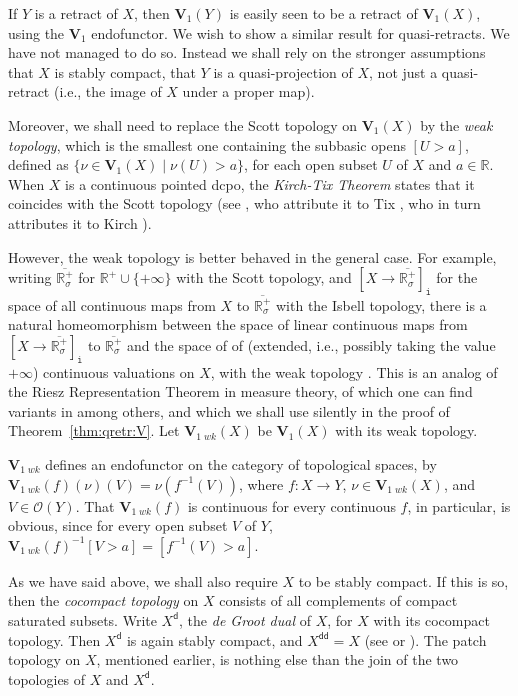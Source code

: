 \documentclass{LMCS}
\newcommand\Open{\mathcal O}
\newcommand\Val{\mathbf V}
\newcommand{\real}{\mathbb{R}}
\newcommand{\creal}{\overline{\real^+_\sigma}}
\newcommand\dG{{\mathsf{d}}}
\begin{document}
If $Y$ is a retract of $X$, then $\Val_1 (Y)$ is easily seen to be a
retract of $\Val_1 (X)$, using the $\Val_1$ endofunctor.  We wish to
show a similar result for quasi-retracts.  We have not managed to do
so.  Instead we shall rely on the stronger assumptions that $X$ is
stably compact, that $Y$ is a quasi-projection of $X$, not just a
quasi-retract (i.e., the image of $X$ under a proper map).

Moreover, we shall need to replace the Scott topology on $\Val_1 (X)$
by the {\em weak topology\/}, which is the smallest one containing the
subbasic opens $[U > a]$, defined as $\{\nu \in \Val_1 (X) \mid \nu
(U) > a\}$, for each open subset $U$ of $X$ and $a \in \real$.  When
$X$ is a continuous pointed dcpo, the \emph{Kirch-Tix Theorem} states
that it coincides with the Scott topology (see \cite{AMJK:scs:prob},
who attribute it to Tix \cite[Satz~4.10]{Tix:bewertung}, who in turn
attributes it to Kirch \cite[Satz~8.6]{Kirch:bewertung}).

However, the weak topology is better behaved in the general case.  For
example, writing $\creal$ for $\real^+ \cup \{+\infty\}$ with the
Scott topology, and $[X \to \creal]_{\texttt{i}}$ for the space of all
continuous maps from $X$ to $\creal$ with the Isbell topology, there
is a natural homeomorphism between the space of linear continuous maps
from $[X \to \creal]_{\texttt{i}}$ to $\creal$ and the space of of
(extended, i.e., possibly taking the value $+\infty$) continuous
valuations on $X$, with the weak topology
\cite[Theorem~8.1]{Heckmann:space:val}.  This is an analog of the
Riesz Representation Theorem in measure theory, of which one can find
variants in \cite{Tix:bewertung,Gou-csl07} among others, and which we
shall use silently in the proof of Theorem~\ref{thm:qretr:V}.  Let
$\Val_{1\;wk} (X)$ be $\Val_1 (X)$ with its weak topology.

$\Val_{1\;wk}$ defines an endofunctor on the category of topological
spaces, by $\Val_{1\;wk} (f) (\nu) (V) = \nu (f^{-1} (V))$, where $f :
X \to Y$, $\nu \in \Val_{1\;wk} (X)$, and $V \in \Open (Y)$.  That
$\Val_{1\;wk} (f)$ is continuous for every continuous $f$, in
particular, is obvious, since for every open subset $V$ of $Y$,
$\Val_{1\;wk} (f)^{-1} [V > a] = [f^{-1} (V) > a]$.

As we have said above, we shall also require $X$ to be stably compact.
If this is so, then the \emph{cocompact topology} on $X$ consists of
all complements of compact saturated subsets.  Write $X^\dG$, the
\emph{de Groot dual} of $X$, for $X$ with its cocompact topology.
Then $X^\dG$ is again stably compact, and $X^{\dG\dG} = X$ (see
\cite[Corollary~12]{AMJK:scs:prob} or
\cite[Corollary~VI-6.19]{GHKLMS:contlatt}).  The patch topology on
$X$, mentioned earlier, is nothing else than the join of the two
topologies of $X$ and $X^\dG$.
\end{document}
